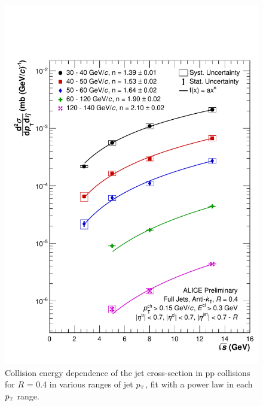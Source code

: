 \documentclass[ALICE]{ALICE_analysis_notes}
\newcommand{\pT}{$p_{\mbox{\tiny T}}$\xspace}
\newcommand{\pp}{pp\xspace}
\begin{document}
\begin{appendix}
\begin{figure}[h!]
    \centering
    \includegraphics[width=15cm]{figures/EnergyComparisons/sqrtSComp_R04.pdf}
    \caption{Collision energy dependence of the jet cross-section in \pp collisions for $R$ = 0.4 in various ranges of jet \pT, fit with a power law in each \pT range.}
    \label{fig:appSqrtSCompareR04}
\end{figure}


\end{appendix}
\end{document}
